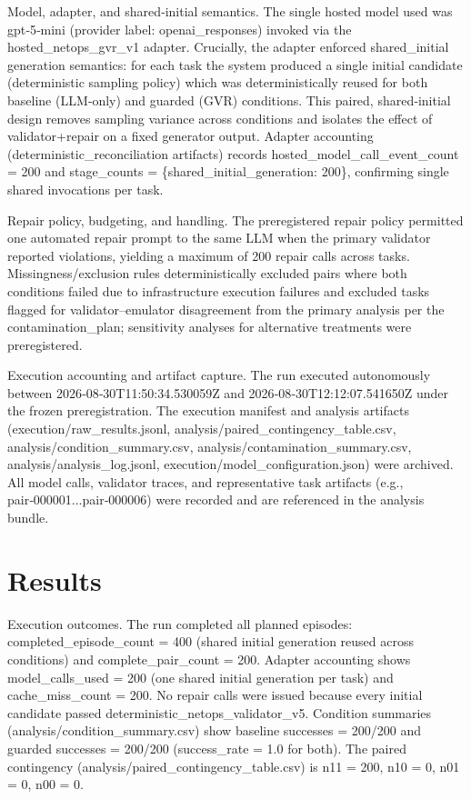 \documentclass[conference]{IEEEtran}
\begin{document}
Model, adapter, and shared‑initial semantics. The single hosted model used was gpt‑5‑mini (provider label: openai\_responses) invoked via the hosted\_netops\_gvr\_v1 adapter. Crucially, the adapter enforced shared\_initial generation semantics: for each task the system produced a single initial candidate (deterministic sampling policy) which was deterministically reused for both baseline (LLM‑only) and guarded (GVR) conditions. This paired, shared‑initial design removes sampling variance across conditions and isolates the effect of validator+repair on a fixed generator output. Adapter accounting (deterministic\_reconciliation artifacts) records hosted\_model\_call\_event\_count = 200 and stage\_counts = \{shared\_initial\_generation: 200\}, confirming single shared invocations per task.

Repair policy, budgeting, and handling. The preregistered repair policy permitted one automated repair prompt to the same LLM when the primary validator reported violations, yielding a maximum of 200 repair calls across tasks. Missingness/exclusion rules deterministically excluded pairs where both conditions failed due to infrastructure execution failures and excluded tasks flagged for validator--emulator disagreement from the primary analysis per the contamination\_plan; sensitivity analyses for alternative treatments were preregistered.

Execution accounting and artifact capture. The run executed autonomously between 2026‑08‑30T11:50:34.530059Z and 2026‑08‑30T12:12:07.541650Z under the frozen preregistration. The execution manifest and analysis artifacts (execution/raw\_results.jsonl, analysis/paired\_contingency\_table.csv, analysis/condition\_summary.csv, analysis/contamination\_summary.csv, analysis/analysis\_log.jsonl, execution/model\_configuration.json) were archived. All model calls, validator traces, and representative task artifacts (e.g., pair‑000001...pair‑000006) were recorded and are referenced in the analysis bundle.

\section{Results}
Execution outcomes. The run completed all planned episodes: completed\_episode\_count = 400 (shared initial generation reused across conditions) and complete\_pair\_count = 200. Adapter accounting shows model\_calls\_used = 200 (one shared initial generation per task) and cache\_miss\_count = 200. No repair calls were issued because every initial candidate passed deterministic\_netops\_validator\_v5. Condition summaries (analysis/condition\_summary.csv) show baseline successes = 200/200 and guarded successes = 200/200 (success\_rate = 1.0 for both). The paired contingency (analysis/paired\_contingency\_table.csv) is n11 = 200, n10 = 0, n01 = 0, n00 = 0.
\end{document}
